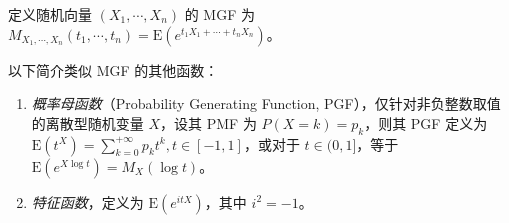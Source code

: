 \documentclass[../main.tex]{subfiles}
\begin{document}
定义随机向量 $(X_1,\cdots,X_n)$ 的 MGF 为 $M_{X_1,\cdots,X_n}(t_1,\cdots,t_n)=\mathrm E(e^{t_1X_1+\cdots+t_nX_n})$。

以下简介类似 MGF 的其他函数：
\begin{enumerate}
    \item \emph{概率母函数}（Probability Generating Function, PGF），仅针对非负整数取值的离散型随机变量 $X$，设其 PMF 为 $P(X=k)=p_k$，则其 PGF 定义为 $\mathrm E(t^X)=\sum_{k=0}^{+\infty}p_kt^k,t\in[-1,1]$，或对于 $t\in(0,1]$，等于 $\mathrm E(e^{X\log t})=M_X(\log t)$。
    \item \emph{特征函数}，定义为 $\mathrm E(e^{itX})$，其中 $i^2=-1$。
\end{enumerate}
\end{document}

